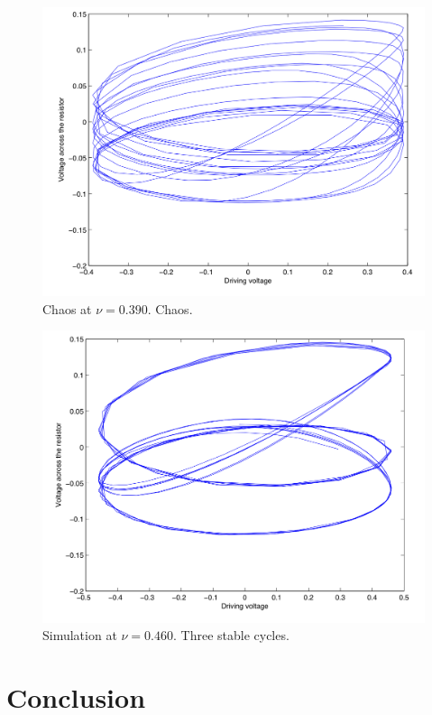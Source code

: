 \documentclass[12pt]{report}
\begin{document}
	\begin{figure}
		\centering
		\includegraphics{simulations/plotnu0390.png}
		\caption{Chaos at $\nu=0.390$. Chaos.}
		\label{fig:sim.0390}
	\end{figure}

	\begin{figure}
		\centering
		\includegraphics{simulations/plotnu0460.png}
		\caption{Simulation at $\nu=0.460$. Three stable cycles.}
		\label{fig:sim.0460}
	\end{figure}




	\chapter{Conclusion}
\end{document}
